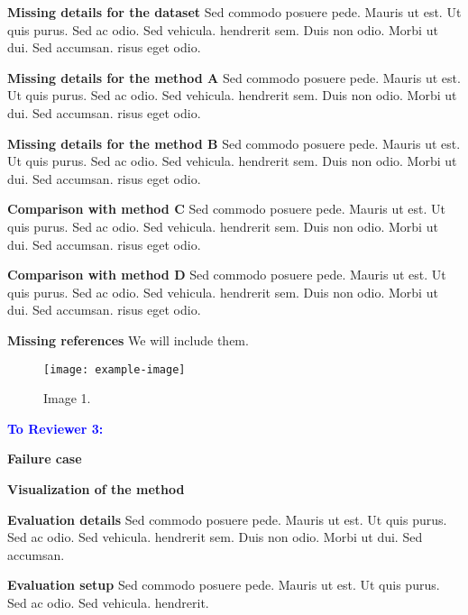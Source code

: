 \documentclass[10pt,twocolumn,letterpaper]{article}
\newcommand{\toreviewer}[1]{\vspace{0.4em}\noindent \textcolor{blue}{\textbf{#1 \hspace{0.2em}}}}
\newcommand{\issue}[1]{\vspace{0.1em}\noindent \textbf{#1 \hspace{0.2em}}}
\begin{document}
\issue{Missing details for the dataset} 
Sed commodo posuere pede. Mauris ut est. Ut quis purus. Sed ac odio. Sed vehicula. hendrerit sem. Duis non odio. Morbi ut dui. Sed accumsan. risus eget odio. 

\issue{Missing details for the method A} 
Sed commodo posuere pede. Mauris ut est. Ut quis purus. Sed ac odio. Sed vehicula. hendrerit sem. Duis non odio. Morbi ut dui. Sed accumsan. risus eget odio. 

\issue{Missing details for the method B} 
Sed commodo posuere pede. Mauris ut est. Ut quis purus. Sed ac odio. Sed vehicula. hendrerit sem. Duis non odio. Morbi ut dui. Sed accumsan. risus eget odio. 

\issue{Comparison with method C} 
Sed commodo posuere pede. Mauris ut est. Ut quis purus. Sed ac odio. Sed vehicula. hendrerit sem. Duis non odio. Morbi ut dui. Sed accumsan. risus eget odio. 

\issue{Comparison with method D} 
Sed commodo posuere pede. Mauris ut est. Ut quis purus. Sed ac odio. Sed vehicula. hendrerit sem. Duis non odio. Morbi ut dui. Sed accumsan. risus eget odio. 

\issue{Missing references} 
We will include them. 

\begin{figure}[tb] \centering
    \texttt{[image: example-image]}
    \caption{Image 1.} \label{fig:img1}
    \vspace{-1em}
\end{figure}

\toreviewer{To Reviewer 3:}

\issue{Failure case} 
\lipsum[5]

\issue{Visualization of the method} 
\lipsum[6]

\issue{Evaluation details}
Sed commodo posuere pede. Mauris ut est. Ut quis purus. Sed ac odio. Sed vehicula. hendrerit sem. Duis non odio. Morbi ut dui. Sed accumsan.

\issue{Evaluation setup}
Sed commodo posuere pede. Mauris ut est. Ut quis purus. Sed ac odio. Sed vehicula. hendrerit.

\end{document}

